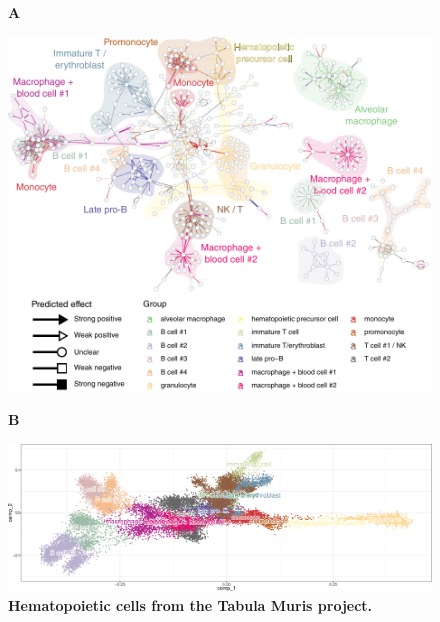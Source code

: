 \begin{figure}[htb!]
	{\raggedright\textbf{A}}
	\begin{center}\includegraphics[width=.9\linewidth]{fig/tabula_muris_hema/grouped_interactions.pdf}\end{center}
	{\raggedright\textbf{B}}
	\begin{center}\includegraphics[width=\linewidth]{fig/tabula_muris_hema/plot_fr_cropped.png}\end{center}
	\caption{
		\textbf{Hematopoietic cells from the Tabula Muris project.}
	}
	\label{fig:tabmur}
\end{figure}


